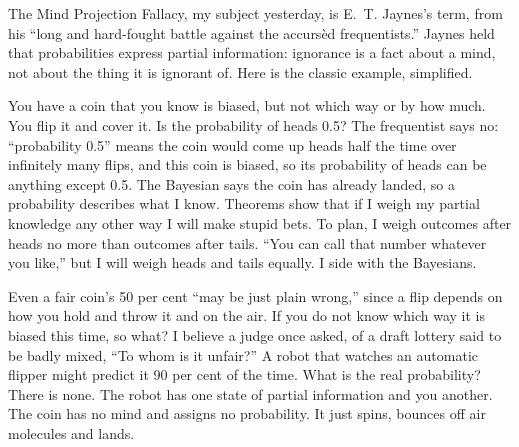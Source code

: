 
The Mind Projection Fallacy, my subject yesterday, is E.~T. Jaynes's term, from his ``long and hard-fought battle against the accursèd frequentists.'' Jaynes held that probabilities express partial information: ignorance is a fact about a mind, not about the thing it is ignorant of. Here is the classic example, simplified.

You have a coin that you know is biased, but not which way or by how much. You flip it and cover it. Is the probability of heads 0.5? The frequentist says no: ``probability 0.5'' means the coin would come up heads half the time over infinitely many flips, and this coin is biased, so its probability of heads can be anything except 0.5.  The Bayesian says the coin has already landed, so a probability describes what I know. Theorems show that if I weigh my partial knowledge any other way I will make stupid bets. To plan, I weigh outcomes after heads no more than outcomes after tails. ``You can call that number whatever you like,'' but I will weigh heads and tails equally.  I side with the Bayesians.

Even a fair coin's 50 per cent ``may be just plain wrong,'' since a flip depends on how you hold and throw it and on the air. If you do not know which way it is biased this time, so what?  I believe a judge once asked, of a draft lottery said to be badly mixed, ``To whom is it unfair?''  A robot that watches an automatic flipper might predict it 90 per cent of the time. What is the real probability? There is none. The robot has one state of partial information and you another. The coin has no mind and assigns no probability. It just spins, bounces off air molecules and lands. 

